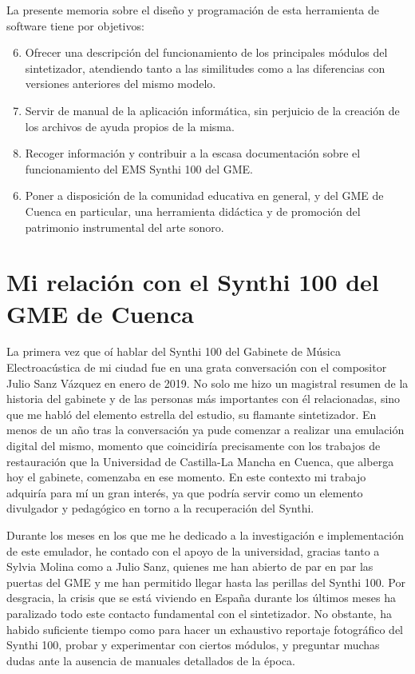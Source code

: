 La presente memoria sobre el diseño y programación de esta herramienta de software tiene por objetivos:

\begin{enumerate}
	\setcounter{enumi}{5}
	\item Ofrecer una descripción del funcionamiento de los principales módulos del sintetizador, atendiendo tanto a las similitudes como a las diferencias con versiones anteriores del mismo modelo.
	\item Servir de manual de la aplicación informática, sin perjuicio de la creación de los archivos de ayuda propios de la misma.
	\item Recoger información y contribuir a la escasa documentación sobre el funcionamiento del EMS Synthi 100 del GME.
\end{enumerate}



\begin{enumerate}
	\setcounter{enumi}{5}
	\item Poner a disposición de la comunidad educativa en general, y del GME de Cuenca en particular, una herramienta didáctica y de promoción del patrimonio instrumental del arte sonoro.
\end{enumerate}



\section[Mi relación con el Synthi 100\dots]{Mi relación con el Synthi 100 del GME de Cuenca }

La primera vez que oí hablar del Synthi 100 del Gabinete de Música Electroacústica de mi ciudad fue en una grata conversación con el compositor Julio Sanz Vázquez en enero de 2019. No solo me hizo un magistral resumen de la historia del gabinete y de las personas más importantes con él relacionadas, sino que me habló del elemento estrella del estudio, su flamante sintetizador. En menos de un año tras la conversación ya pude comenzar a realizar una emulación digital del mismo, momento que coincidiría precisamente con los trabajos de restauración que la Universidad de Castilla-La Mancha en Cuenca, que alberga hoy el gabinete, comenzaba en ese momento. En este contexto mi trabajo adquiría para mí un gran interés, ya que podría servir como un elemento divulgador y pedagógico en torno a la recuperación del Synthi. 

Durante los meses en los que me he dedicado a la investigación e implementación de este emulador, he contado con el apoyo de la universidad, gracias tanto a Sylvia Molina como a Julio Sanz, quienes me han abierto de par en par las puertas del GME y me han permitido llegar hasta las perillas del Synthi 100. Por desgracia, la crisis que se está viviendo en España durante los últimos meses ha paralizado todo este contacto fundamental con el sintetizador. No obstante, ha habido suficiente tiempo como para hacer un exhaustivo reportaje fotográfico del Synthi 100, probar y experimentar con ciertos módulos, y preguntar muchas dudas ante la ausencia de manuales detallados de la época.


